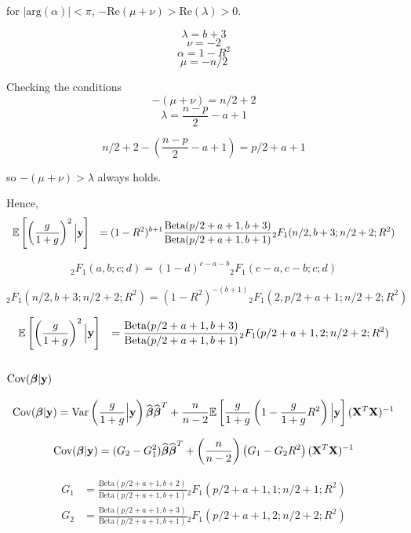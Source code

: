 \documentclass{article}
\def\vectorfontone{\bf}
\def\vectorfonttwo{\boldsymbol}
\def\vy{{\vectorfontone y}}                      %
\def\vbeta{{\vectorfonttwo \beta}}               %
\def\matrixfontone{\bf}
\def\mX{{\matrixfontone X}}                      %
\def\bE{{\mathbb E}}                             %
\def\ds{\displaystyle}
\theoremstyle{definition}
\begin{document}
\noindent for $|\mbox{arg}(\alpha)|<\pi$, $-\mbox{Re}(\mu+\nu)>\mbox{Re}(\lambda)>0$.

$$
\lambda = b + 3
$$ 
$$
\nu = -2
$$
$$
\alpha = 1 - R^2
$$
$$
\mu = - n/2
$$

\noindent Checking the conditions
$$
- (\mu + \nu) = n/2 + 2
$$
$$
\lambda = \frac{n - p}{2} - a + 1
$$

$$
n/2 + 2 - (\frac{n - p}{2} - a + 1) = p/2 + a + 1
$$

\noindent so $-(\mu + \nu)>\lambda$ always holds.

\medskip 
\noindent Hence,
$$
\begin{array}{rl}
\ds \bE\left[ \left(  \frac{g}{1+g} \right)^2  \Big| \vy \right]
& \ds = (1 -  R^2)^{b+1} 
\frac{
	\mbox{Beta}(p/2 + a+ 1,b + 3) 
}{
	\mbox{Beta}(p/2 + a + 1,b+1)
} 
{}_2 F_1(n/2,b+3;n/2+2; R^2)
\end{array}
$$



$$
{}_2 F_1(a,b;c;d) = (1 - d)^{c-a-b} {}_2 F_1(c-a,c-b;c;d)
$$

$$
{}_2 F_1(n/2,b+3;n/2+2; R^2) = (1 - R^2)^{- (b+1)}
{}_2 F_1(2,p/2 + a + 1;n/2 + 2; R^2)
$$


$$
\begin{array}{rl}
\ds \bE\left[ \left(  \frac{g}{1+g} \right)^2  \Big| \vy \right]
& \ds =  
\frac{
	\mbox{Beta}(p/2 + a+ 1,b + 3) 
}{
\mbox{Beta}(p/2 + a + 1,b+1)
} 
{}_2 F_1(p/2 + a + 1,2;n/2 + 2; R^2)
\end{array}
$$

\subsection{$\mbox{Cov}(\vbeta|\vy)$}


$$
\mbox{Cov}(\vbeta|\vy)
= \mbox{Var}\left( \frac{g}{1 + g} \Big| \vy \right) \widehat{\vbeta}\widehat{\vbeta}^T
+ \frac{n}{n - 2} \bE \left[ \frac{g}{1+g} \left( 
1 -
\frac{g}{1+g} R^2\right) \Big|\vy \right] (\mX^T\mX)^{-1}
$$


$$
\mbox{Cov}(\vbeta|\vy)
= (G_2 - G_1^2) \widehat{\vbeta}\widehat{\vbeta}^T
+ \left( \frac{n}{n - 2} \right) \left(  
G_1 - G_2 R^2\right) (\mX^T\mX)^{-1}
$$

$$
\begin{array}{rl}
\ds G_1
& \ds =  \frac{ \mbox{Beta}(p/2 + a + 1,b + 2) }{\mbox{Beta}(p/2 + a + 1,b+1)}  
{}_2 F_1(p/2 + a + 1,1;n/2 + 1;R^2)

\\ [2ex]

\ds G_2 
& \ds =
\frac{
	\mbox{Beta}(p/2 + a+ 1,b + 3) 
}{
\mbox{Beta}(p/2 + a + 1,b+1)
} 
{}_2 F_1(p/2 + a + 1,2;n/2 + 2; R^2)
\end{array}
$$
\end{document}

